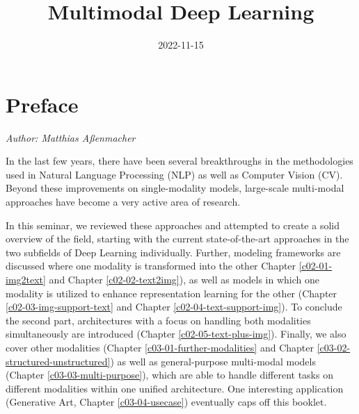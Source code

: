 \documentclass[
]{krantz}
\title{Multimodal Deep Learning}
\author{}
\date{\vspace{-2.5em}2022-11-15}
\begin{document}
\maketitle


\thispagestyle{empty}

\begin{center}
\end{center}

\setlength{\abovedisplayskip}{-5pt}
\setlength{\abovedisplayshortskip}{-5pt}

{
\hypersetup{linkcolor=}
\setcounter{tocdepth}{1}
\tableofcontents
}
\hypertarget{preface}{%
\chapter*{Preface}\label{preface}}


\emph{Author: Matthias Aßenmacher}

In the last few years, there have been several breakthroughs in the methodologies used in Natural Language Processing (NLP) as well as Computer Vision (CV). Beyond these improvements on single-modality models, large-scale multi-modal approaches have become a very active area of research.

In this seminar, we reviewed these approaches and attempted to create a solid overview of the field, starting with the current state-of-the-art approaches in the two subfields of Deep Learning individually. Further, modeling frameworks are discussed where one modality is transformed into the other Chapter \ref{c02-01-img2text} and Chapter \ref{c02-02-text2img}), as well as models in which one modality is utilized to enhance representation learning for the other (Chapter \ref{c02-03-img-support-text} and Chapter \ref{c02-04-text-support-img}). To conclude the second part, architectures with a focus on handling both modalities simultaneously are introduced (Chapter \ref{c02-05-text-plus-img}). Finally, we also cover other modalities (Chapter \ref{c03-01-further-modalities} and Chapter \ref{c03-02-structured-unstructured}) as well as general-purpose multi-modal models (Chapter \ref{c03-03-multi-purpose}), which are able to handle different tasks on different modalities within one unified architecture. One interesting application (Generative Art, Chapter \ref{c03-04-usecase}) eventually caps off this booklet.
\end{document}
